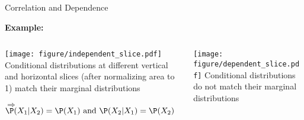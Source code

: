 \documentclass[11pt,compress,t,notes=noshow, aspectratio=169, xcolor=table]{beamer}
\begin{document}
\begin{frame}{Correlation and Dependence}
	
\textbf{Example:}
\begin{columns}[T, totalwidth=\linewidth]
\begin{column}{0.49\linewidth}
\texttt{[image: figure/independent\_slice.pdf]}
Conditional distributions at different vertical and horizontal slices (after normalizing area to 1) match their marginal distributions
\medskip

$\Rightarrow$ $\P(X_1|X_2) = \P(X_1) \text{ and } \P(X_2|X_1) = \P(X_2)$
\end{column}
\hfill\pause
\begin{column}{0.49\linewidth}
\texttt{[image: figure/dependent\_slice.pdf]}
Conditional distributions do not match their marginal distributions
\end{column}
\end{columns}


\end{frame}
\end{document}
